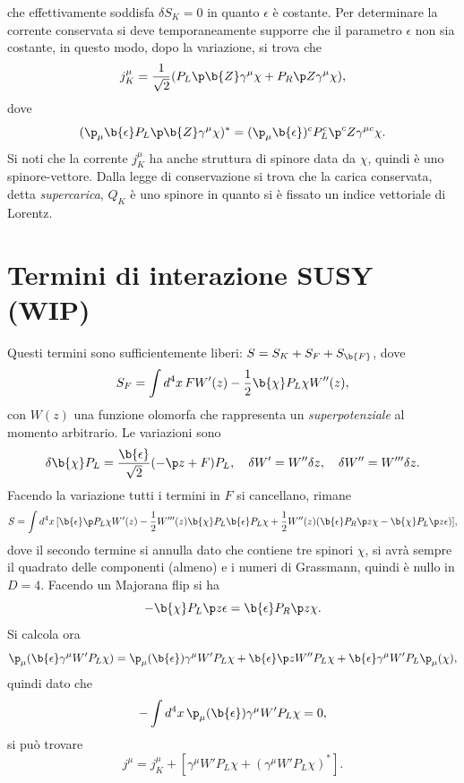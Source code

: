 che effettivamente soddisfa $\delta S_K = 0$ in quanto $\epsilon$ è costante. Per determinare la corrente conservata si deve temporaneamente supporre che il parametro $\epsilon$ non sia costante, in questo modo, dopo la variazione, si trova che 
\begin{equation}
    j^\mu_K = \frac{1}{\sqrt{2}}(P_L\sl{\p}\b{Z}\gamma^\mu\chi + P_R\sl{\p}Z\gamma^\mu\chi),
\end{equation}
dove 
\begin{equation}
    (\p_\mu\b{\epsilon}P_L\sl{\p}\b{Z}\gamma^\mu\chi)^* = (\p_\mu\b{\epsilon})^cP_L^c\sl{\p}^cZ\gamma^{\mu c}\chi.
\end{equation}
Si noti che la corrente $j^\mu_K$ ha anche struttura di spinore data da $\chi$, quindi è uno spinore-vettore. Dalla legge di conservazione si trova che la carica conservata, detta \emph{supercarica}, $Q_K$ è uno spinore in quanto si è fissato un indice vettoriale di Lorentz. 

\section{Termini di interazione SUSY (WIP)}
Questi termini sono sufficientemente liberi: $S = S_K + S_F + S_{\b{F}}$, dove 
\begin{equation}
    S_F = \int d^4x\,FW'(z) - \frac{1}{2}\b{\chi}P_L\chi W''(z),
\end{equation}
con $W(z)$ una funzione olomorfa che rappresenta un \emph{superpotenziale} al momento arbitrario. Le variazioni sono 
\begin{equation}
    \delta \b{\chi}P_L = \frac{\b{\epsilon}}{\sqrt{2}}(-\sl{\p} z + F)P_L,\quad \delta W' = W''\delta z,\quad \delta W'' = W'''\delta z.
\end{equation}
Facendo la variazione tutti i termini in $F$ si cancellano, rimane 
\begin{equation}
    S = \int d^4x\,[\b{\epsilon}\sl{\p}P_L\chi W'(z) - \frac{1}{2}W'''(z)\b{\chi}P_L\b{\epsilon}P_L\chi + \frac{1}{2}W''(z)(\b{\epsilon}P_R\sl{\p}z\chi - \b{\chi}P_L\sl{\p}z\epsilon)],
\end{equation}
dove il secondo termine si annulla dato che contiene tre spinori $\chi$, si avrà sempre il quadrato delle componenti (almeno) e i numeri di Grassmann, quindi è nullo in $D = 4$. Facendo un Majorana flip si ha 
\begin{equation}
    -\b{\chi}P_L\sl{\p}z\epsilon = \b{\epsilon}P_R\sl{\p}z\chi.
\end{equation}
Si calcola ora 
\begin{equation}
    \p_\mu(\b{\epsilon}\gamma^\mu W'P_L\chi) = \p_\mu(\b{\epsilon})\gamma^\mu W'P_L\chi + \b{\epsilon}\sl{\p} zW''P_L\chi + \b{\epsilon}\gamma^\mu W'P_L\p_\mu(\chi),
\end{equation}
quindi dato che 
\begin{equation}
    -\int d^4x\,\p_\mu(\b{\epsilon})\gamma^\mu W'P_L\chi = 0,
\end{equation}
si può trovare 
\begin{equation}
    j^\mu = j^\mu_K + [\gamma^\mu W'P_L\chi + (\gamma^\mu W'P_L\chi)^*].
\end{equation}